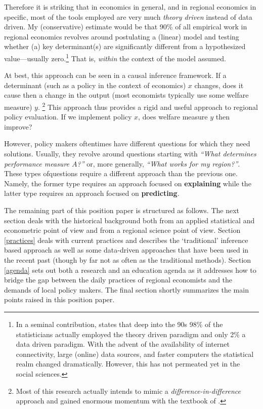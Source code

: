 \documentclass[fleqn,10pt]{SelfArx} %
\begin{document}
Therefore it is striking that in economics in general, and in regional economics in specific, most of the tools employed are very much \textit{theory driven} instead of data driven. My (conservative) estimate would be that 90\% of all empirical work in regional economics revolves around postulating a (linear) model and testing whether (a) key determinant(s) are significantly different from a hypothesized value---usually zero.\footnote{In a seminal contribution, \cite{breiman2001statistical} states that deep into the 90s 98\% of the statisticians actually employed the theory driven paradigm and only 2\% a data driven paradigm. With the advent of the availability of internet connectivity, large (online) data sources, and faster computers the statistical realm changed dramatically. However, this has not permeated yet in the social sciences.} That is, \textit{within} the context of the model assumed.

At best, this approach can be seen in a causal inference framework. If a determinant (such as a policy in the context of economics) $x$ changes, does it cause then a change in the output (most economists typically use some welfare measure) $y$. \footnote{Most of this research actually intends to mimic a \textit{difference-in-difference} approach and gained enormous momentum with the textbook of \citet{angrist2008mostly}.} This approach thus provides a rigid and useful approach to regional policy evaluation. If we implement policy $x$, does welfare measure $y$ then improve? 

However, policy makers oftentimes have different questions for which they need
solutions. Usually, they revolve around questions starting with \textit{``What
  determines performance measure $A$?''} or, more generally, \textit{``What
  works for my region?''}. These types ofquestions require a different approach
than the previous one. Namely, the former type requires an approach focused on \textbf{explaining} while the latter type requires an approach focused on \textbf{predicting}.

The remaining part of this position paper is structured as follows. The next
section deals with the historical background both from an applied statistical
and econometric point of view and from a regional science point of view. Section
\ref{practices} deals with current practices and describes the `traditional'
inference based approach as well as some data-driven approaches that have been
used in the recent past (though by far not as often as the traditional methods).
Section \ref{agenda} sets out both a research and an education agenda as it
addresses how to bridge the gap between the daily practices of regional
economists and the demands of local policy makers. The final section shortly
summarizes the main points raised in this position paper.  
\end{document}
